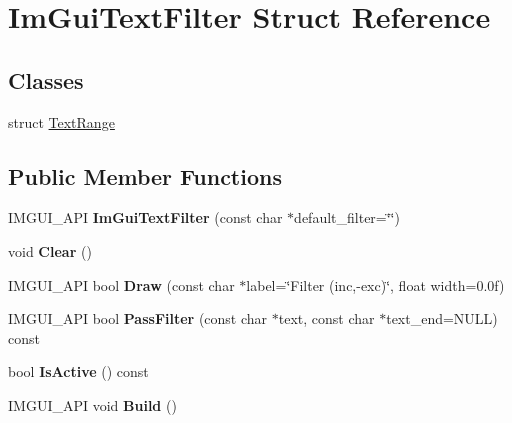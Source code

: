 \hypertarget{struct_im_gui_text_filter}{}\section{Im\+Gui\+Text\+Filter Struct Reference}
\label{struct_im_gui_text_filter}
\subsection*{Classes}
\begin{DoxyCompactItemize}
\item 
struct \hyperlink{struct_im_gui_text_filter_1_1_text_range}{Text\+Range}
\end{DoxyCompactItemize}
\subsection*{Public Member Functions}
\begin{DoxyCompactItemize}
\item 
\mbox{\label{struct_im_gui_text_filter_a0a61ee76f0b4f3c354791734b06e3140}} 
I\+M\+G\+U\+I\+\_\+\+A\+PI {\bfseries Im\+Gui\+Text\+Filter} (const char $\ast$default\+\_\+filter=\char`\"{}\char`\"{})
\item 
\mbox{\label{struct_im_gui_text_filter_a9043c1f0c33d29e6fc9b75ae81f9705a}} 
void {\bfseries Clear} ()
\item 
\mbox{\label{struct_im_gui_text_filter_ab93ad5985019ff9d3781606551fc26cc}} 
I\+M\+G\+U\+I\+\_\+\+A\+PI bool {\bfseries Draw} (const char $\ast$label=\char`\"{}Filter (inc,-\/exc)\char`\"{}, float width=0.\+0f)
\item 
\mbox{\label{struct_im_gui_text_filter_a88d73ff8b81fbbd0a129b1bf3498d8aa}} 
I\+M\+G\+U\+I\+\_\+\+A\+PI bool {\bfseries Pass\+Filter} (const char $\ast$text, const char $\ast$text\+\_\+end=N\+U\+LL) const
\item 
\mbox{\label{struct_im_gui_text_filter_a493158f2ab8f45fcf303c3f953be9b88}} 
bool {\bfseries Is\+Active} () const
\item 
\mbox{\label{struct_im_gui_text_filter_aef362baafaa9dfa62d11bc6101c0f4c1}} 
I\+M\+G\+U\+I\+\_\+\+A\+PI void {\bfseries Build} ()
\end{DoxyCompactItemize}
